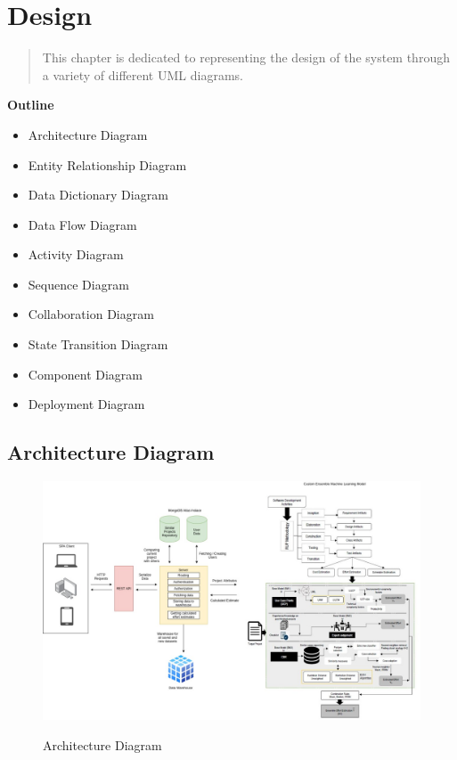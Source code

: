 
\section{Design}

\vspace{20mm}



\begin{abstract}

    This chapter is dedicated to representing the design of the system through a variety of different UML diagrams.


\end{abstract}

\vspace{20mm}

\large{\textbf{Outline}}

\begin{center}
    \begin{itemize}
        \item Architecture Diagram
        \item Entity Relationship Diagram
        \item Data Dictionary Diagram
        \item Data Flow Diagram
        \item Activity Diagram
        \item Sequence Diagram
        \item Collaboration Diagram
        \item State Transition Diagram
        \item Component Diagram
        \item Deployment Diagram
    \end{itemize}
\end{center}
\pagebreak


\subsection{Architecture Diagram}
\begin{figure}[H]
    \centering
    \caption{Architecture Diagram}
    \includegraphics[scale=0.4]{./diagrams/architecture-diagram.jpeg}
    \label{fig:arch-diag}

\end{figure}


